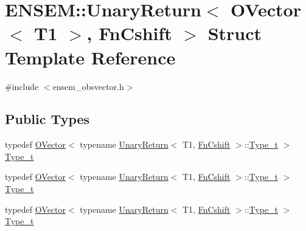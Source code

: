 \hypertarget{structENSEM_1_1UnaryReturn_3_01OVector_3_01T1_01_4_00_01FnCshift_01_4}{}\section{E\+N\+S\+EM\+:\+:Unary\+Return$<$ O\+Vector$<$ T1 $>$, Fn\+Cshift $>$ Struct Template Reference}
\label{structENSEM_1_1UnaryReturn_3_01OVector_3_01T1_01_4_00_01FnCshift_01_4}


{\ttfamily \#include $<$ensem\+\_\+obsvector.\+h$>$}

\subsection*{Public Types}
\begin{DoxyCompactItemize}
\item 
typedef \mbox{\hyperlink{classENSEM_1_1OVector}{O\+Vector}}$<$ typename \mbox{\hyperlink{structENSEM_1_1UnaryReturn}{Unary\+Return}}$<$ T1, \mbox{\hyperlink{structENSEM_1_1FnCshift}{Fn\+Cshift}} $>$\+::\mbox{\hyperlink{structENSEM_1_1UnaryReturn_3_01OVector_3_01T1_01_4_00_01FnCshift_01_4_a6a3a9c4bf8437765b92d9c0d26f56a19}{Type\+\_\+t}} $>$ \mbox{\hyperlink{structENSEM_1_1UnaryReturn_3_01OVector_3_01T1_01_4_00_01FnCshift_01_4_a6a3a9c4bf8437765b92d9c0d26f56a19}{Type\+\_\+t}}
\item 
typedef \mbox{\hyperlink{classENSEM_1_1OVector}{O\+Vector}}$<$ typename \mbox{\hyperlink{structENSEM_1_1UnaryReturn}{Unary\+Return}}$<$ T1, \mbox{\hyperlink{structENSEM_1_1FnCshift}{Fn\+Cshift}} $>$\+::\mbox{\hyperlink{structENSEM_1_1UnaryReturn_3_01OVector_3_01T1_01_4_00_01FnCshift_01_4_a6a3a9c4bf8437765b92d9c0d26f56a19}{Type\+\_\+t}} $>$ \mbox{\hyperlink{structENSEM_1_1UnaryReturn_3_01OVector_3_01T1_01_4_00_01FnCshift_01_4_a6a3a9c4bf8437765b92d9c0d26f56a19}{Type\+\_\+t}}
\item 
typedef \mbox{\hyperlink{classENSEM_1_1OVector}{O\+Vector}}$<$ typename \mbox{\hyperlink{structENSEM_1_1UnaryReturn}{Unary\+Return}}$<$ T1, \mbox{\hyperlink{structENSEM_1_1FnCshift}{Fn\+Cshift}} $>$\+::\mbox{\hyperlink{structENSEM_1_1UnaryReturn_3_01OVector_3_01T1_01_4_00_01FnCshift_01_4_a6a3a9c4bf8437765b92d9c0d26f56a19}{Type\+\_\+t}} $>$ \mbox{\hyperlink{structENSEM_1_1UnaryReturn_3_01OVector_3_01T1_01_4_00_01FnCshift_01_4_a6a3a9c4bf8437765b92d9c0d26f56a19}{Type\+\_\+t}}
\end{DoxyCompactItemize}


